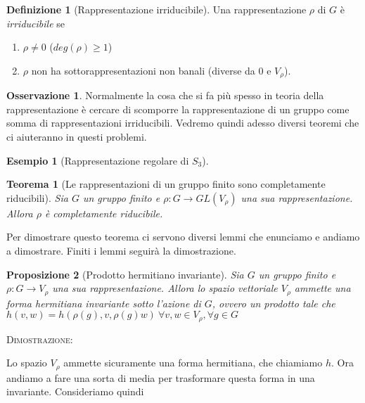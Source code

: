 \documentclass[11pt]{article}
\theoremstyle{plain}
\newtheorem{thm}{Teorema}[section]
\newtheorem{prop}[thm]{Proposizione}
\theoremstyle{definition}
\newtheorem{defn}{Definizione}[section]
\newtheorem{exmp}{Esempio}[section]
\newtheorem*{rem}{Osservazione}
\theoremstyle{remark}
\begin{document}
\begin{defn}[Rappresentazione irriducibile]
Una rappresentazione $\rho$ di $G$ è \textit{irriducibile} se
\begin{enumerate}
	\item $\rho \neq 0$ ($deg(\rho) \geq 1$)
	\item $\rho$ non ha sottorappresentazioni non banali (diverse da 0 e $V_{\rho}$).
\end{enumerate}

\end{defn}

\begin{rem} Normalmente la cosa che si fa più spesso in teoria della rappresentazione è cercare di scomporre la rappresentazione di un gruppo come somma di rappresentazioni irriducibili. Vedremo quindi adesso diversi teoremi che ci aiuteranno in questi problemi.

\end{rem}



\begin{exmp}[Rappresentazione regolare di $S_3$]


\end{exmp}



\begin{thm}[Le rappresentazioni di un gruppo finito sono completamente riducibili]
  Sia $G$ un gruppo finito e $\rho: G \to GL(V_\rho)$ una sua rappresentazione. Allora $\rho$ è completamente riducibile.
  \label{thm:gruppo finito completamente riducibile}
\end{thm}
Per dimostrare questo teorema ci servono diversi lemmi che enunciamo e andiamo a dimostrare. Finiti i lemmi seguirà la dimostrazione.


\begin{prop}[Prodotto hermitiano invariante] Sia $G$ un gruppo finito e $\rho: G \to V_\rho$ una sua rappresentazione. Allora lo spazio vettoriale $V_\rho$ ammette una forma hermitiana invariante sotto l'azione di $G$, ovvero un prodotto tale che $h(v,w) = h(\rho(g), v, \rho(g) w) \ \forall v,w\in V_\rho, \forall g \in G$
\end{prop}

\textsc{Dimostrazione:}

Lo spazio $V_\rho$ ammette sicuramente una forma hermitiana, che chiamiamo $h$. Ora andiamo a fare una sorta di media per trasformare questa forma in una invariante. Consideriamo quindi
\end{document}
